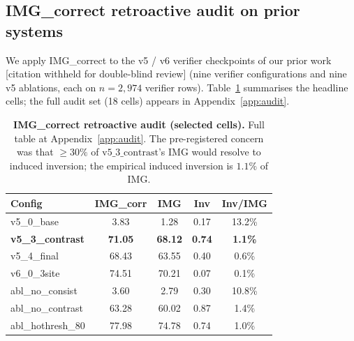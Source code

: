\documentclass{article}
\begin{document}
\subsection{IMG\_correct retroactive audit on prior systems}
\label{sec:audit}

We apply IMG\_correct to the v5 / v6 verifier checkpoints of our prior
work [citation withheld for double-blind review] (nine verifier
configurations and nine v5 ablations, each on $n=2{,}974$ verifier rows).
Table~\ref{tab:audit} summarises the headline cells; the full audit set
(18 cells) appears in Appendix~\ref{app:audit}.

\begin{table}[t]
\centering
\footnotesize
\caption{\textbf{IMG\_correct retroactive audit (selected cells).} Full
table at Appendix~\ref{app:audit}. The pre-registered concern was that
$\geq 30\%$ of $\mathrm{v5\_3\_contrast}$'s IMG would resolve to induced
inversion; the empirical induced inversion is $1.1\%$ of IMG.}
\label{tab:audit}
\setlength{\tabcolsep}{3.5pt}
\begin{tabular}{lcccc}
\toprule
\textbf{Config} & \textbf{IMG\_corr} & \textbf{IMG} & \textbf{Inv} & \textbf{Inv/IMG}\\
\midrule
v5\_0\_base               & 3.83  & 1.28  & 0.17 & 13.2\%\\
\textbf{v5\_3\_contrast}  & \textbf{71.05} & \textbf{68.12} & \textbf{0.74} & \textbf{1.1\%}\\
v5\_4\_final              & 68.43 & 63.55 & 0.40 & 0.6\%\\
v6\_0\_3site              & 74.51 & 70.21 & 0.07 & 0.1\%\\
\addlinespace
abl\_no\_consist          & 3.60  & 2.79  & 0.30 & 10.8\%\\
abl\_no\_contrast         & 63.28 & 60.02 & 0.87 & 1.4\%\\
abl\_hothresh\_80         & 77.98 & 74.78 & 0.74 & 1.0\%\\
\bottomrule
\end{tabular}
\end{table}
\end{document}
